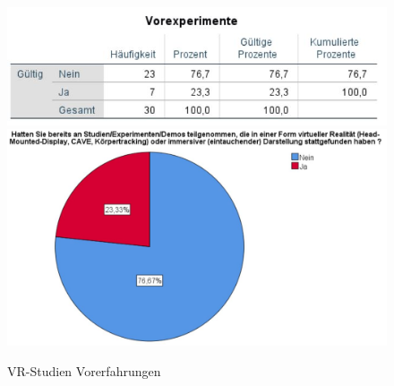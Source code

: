 \documentclass[a4paper,11pt]{article}%
\renewcommand{\\}{\vspace*{0.5\baselineskip} \newline}
\begin{document}
	\begin{figure}[H]
		\begin{footnotesize}
			\includegraphics[width=\textwidth]{Abbildungen/Pre_QuestionnaireStatistiks/teilnehmerVorexperimente}\\
			\includegraphics[width=\textwidth]{Abbildungen/Demographie/teilnehmerVorexperimente}\\
			\caption{VR-Studien Vorerfahrungen}
			\label{fig:teilnehmerVorexperimente}
		\end{footnotesize}
	\end{figure}		
	
\end{document}
